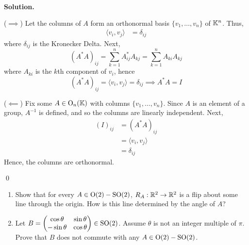 \documentclass[12pt]{book}
\theoremstyle{definition}
\newenvironment{solution}
{%
  \par\noindent\textbf{Solution.}\quad
}
{%
  \qed\par
}
\begin{document}
\begin{solution}
  ($\implies$) Let the columns of $A$ form an orthonormal basis $\{ v_1, \dots, v_n \}$ of $\mathbb{K}^n$.
  Thus,
  \[
  \begin{aligned}
    \langle v_i, v_j \rangle &= \delta_{ij}
  \end{aligned}
  \]
  where $\delta_{ij}$ is the Kronecker Delta.
  Next,
  \[
    (A^*A)_{ij} = \sum_{k = 1}^n A^*_{ij}A_{kj} = \sum_{k = 1}^n A_{ki}A_{kj}
  \]
  where $A_{ki}$ is the $k$th component of $v_i$, hence
  \[
    (A^*A)_{ij} = \langle v_i, v_j \rangle = \delta_{ij} \implies A^*A = I
  \] 

  ($\impliedby$) Fix some $A \in \text{O}_n(\mathbb{K})$ with columns $\{ v_1, \dots, v_n \}$.
  Since $A$ is an element of a group, $A^{-1}$ is defined, and so the columns are linearly independent.
  Next, 
  \[
  \begin{aligned}
    (I)_{ij} &= (A^*A)_{ij} \\
             &= \langle v_i, v_j \rangle \\
             &= \delta_{ij}
  \end{aligned}
  \]     
  Hence, the columns are orthonormal.


\end{solution}

\begin{taggedexercise}[\textcolor{green}{Complete}]
  \begin{enumerate}
    \item Show that for every $A \in \mathrm{O}(2) - \mathrm{SO}(2)$, $R_A: \mathbb{R}^2 \to \mathbb{R}^2$ is a flip about some line through the origin. How is this line determined by the angle of $A$?
    \item Let $B = \begin{pmatrix} \cos \theta & \sin \theta \\ -\sin\theta & \cos\theta \end{pmatrix} \in \mathrm{SO}(2)$. Assume $\theta$ is not an integer multiple of $\pi$. Prove that $B$ does not commute with any $A \in \mathrm{O}(2) - \mathrm{SO}(2)$.
  \end{enumerate}
\end{taggedexercise}
\end{document}
